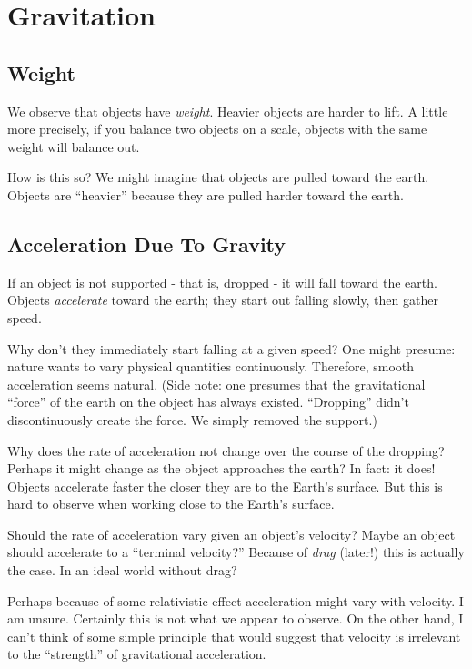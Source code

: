 \section{Gravitation}

\subsection{Weight}

We observe that objects have \emph{weight}. Heavier objects are harder
to lift. A little more precisely, if you balance two objects on a scale,
objects with the same weight will balance out.

How is this so? We might imagine that objects are pulled toward the
earth. Objects are ``heavier'' because they are pulled harder toward the
earth.

\subsection{Acceleration Due To Gravity}

If an object is not supported - that is, dropped - it will fall toward
the earth. Objects \emph{accelerate} toward the earth; they start out
falling slowly, then gather speed.

Why don't they immediately start falling at a given speed? One might
presume: nature wants to vary physical quantities continuously.
Therefore, smooth acceleration seems natural. (Side note: one presumes
that the gravitational ``force'' of the earth on the object has always
existed. ``Dropping'' didn't discontinuously create the force. We simply
removed the support.)

Why does the rate of acceleration not change over the course of the
dropping? Perhaps it might change as the object approaches the earth? In
fact: it does! Objects accelerate faster the closer they are to the
Earth's surface. But this is hard to observe when working close to the
Earth's surface.

Should the rate of acceleration vary given an object's velocity? Maybe
an object should accelerate to a ``terminal velocity?'' Because of
\emph{drag} (later!) this is actually the case. In an ideal world
without drag?

Perhaps because of some relativistic effect acceleration might vary with
velocity. I am unsure. Certainly this is not what we appear to observe.
On the other hand, I can't think of some simple principle that would
suggest that velocity is irrelevant to the ``strength'' of gravitational
acceleration.

